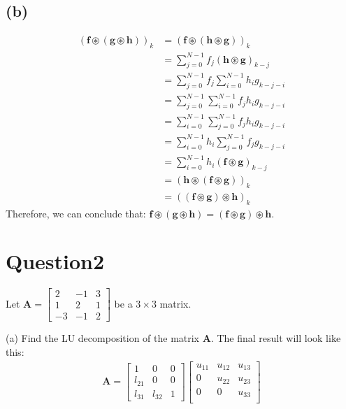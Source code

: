 \documentclass{article}
\begin{document}
\subsection*{(b)}
\begin{align*}
    (\bm{f} \circledast (\bm{g} \circledast \bm{h}))_k &= (\bm{f} \circledast (\bm{h} \circledast \bm{g}))_k \\ 
    &= \sum_{j = 0}^{N-1} f_j(\bm{h} \circledast \bm{g})_{k - j} \\
    &= \sum_{j = 0}^{N-1} f_j \sum_{i = 0}^{N-1} h_i g_{k - j - i} \\
    &= \sum_{j = 0}^{N-1}  \sum_{i = 0}^{N-1} f_j h_i g_{k - j - i} \\
    &= \sum_{i = 0}^{N-1} \sum_{j = 0}^{N-1} f_j h_i g_{k - j - i} \\
    &= \sum_{i = 0}^{N-1} h_i \sum_{j = 0}^{N-1} f_j  g_{k - j - i} \\
    &= \sum_{i = 0}^{N-1} h_i(\bm{f} \circledast \bm{g})_{k - j} \\
    &= (\bm{h} \circledast (\bm{f} \circledast \bm{g}))_k \\
    &= ((\bm{f} \circledast \bm{g}) \circledast \bm{h})_k
\end{align*}
Therefore, we can conclude that: \(\bm{f}\circledast (\bm{g} \circledast \bm{h}) = (\bm{f} \circledast \bm{g}) \circledast \bm{h}\). 

\section*{Question2}
Let \(\bm{A} = \begin{bmatrix}
   2 &-1 &3 \\
   1 & 2& 1 \\
   -3 &-1 &2 
\end{bmatrix}\) be a \(3 \times 3\) matrix.

\noindent 
(a) Find the LU decomposition of the matrix \(\bm{A}\). The final result will look like this:
\begin{align*}
    \bm{A} = \begin{bmatrix}
        1 & 0 & 0 \\
        l_{21} & 0 & 0 \\
        l_{31} & l_{32} & 1 
    \end{bmatrix} \begin{bmatrix}
        u_{11} &u_{12} &u_{13}   \\
        0 &u_{22} &u_{23}   \\
        0 &0 &u_{33}   \\
    \end{bmatrix}
\end{align*}
\end{document}
